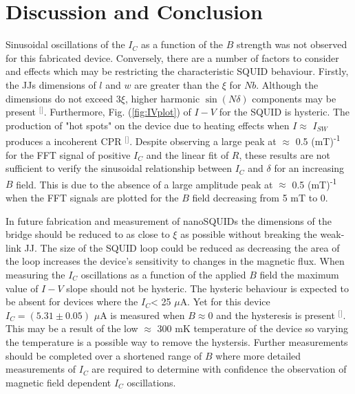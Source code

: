 \section{\label{sec:level1}Discussion and Conclusion}
Sinusoidal oscillations of the $I_C$ as a function of the $B$ strength was not observed for this fabricated device. Conversely, there are a number of factors to consider and effects which may be restricting the characteristic SQUID behaviour. Firstly, the JJs dimensions of $l$ and $w$ are greater than the $\xi$ for $Nb$. Although the dimensions do not exceed 3$\xi$, higher harmonic $\sin (N\delta )$ components may be present $^[$\citep{Clarke2005TheHandbook}$^]$. Furthermore, Fig. (\ref{fig:IVplot}) of $I-V$ for the SQUID is hysteric. The production of "hot spots" on the device due to heating effects when  $I\approx$ $I_{SW}$ produces a incoherent CPR $^[$\citep{Podd2007Micro-SQUIDsJunctions}$^]$. Despite observing a large peak at $\approx$ 0.5 (mT)\textsuperscript{-1} for the FFT signal of positive $I_C$ and the linear fit of $R$, these results are not sufficient to verify the sinusoidal relationship between $I_C$ and $\delta$ for an increasing $B$ field. This is due to the absence of a large amplitude peak at $\approx$ 0.5 (mT)\textsuperscript{-1} when the FFT signals are plotted for the $B$ field decreasing from 5 mT to 0. 

In future fabrication and measurement of nanoSQUIDs the dimensions of the bridge should be reduced to as close to $\xi$ as possible without breaking the weak-link JJ. The size of the SQUID loop could be reduced as decreasing the area of the loop increases the device's sensitivity to changes in the magnetic flux. When measuring the $I_C$ oscillations as a function of the applied $B$ field the maximum value of $I-V$ slope should not be hysteric. The hysteric behaviour is expected to be absent for devices where the $I_C$< 25 $\mu$A. Yet for this device $I_C=(5.31 \pm 0.05)$ $\mu$A is measured when $B\approx$0 and the hysteresis is present $^[$\citep{Hao2015FabricationJunctions}$^]$. This may be a result of the low $\approx$ 300 mK temperature of the device so varying the temperature is a possible way to remove the hystersis. Further measurements should be completed over a shortened range of $B$ where more detailed measurements of $I_C$ are required to determine with confidence the observation of magnetic field dependent $I_C$ oscillations.  




